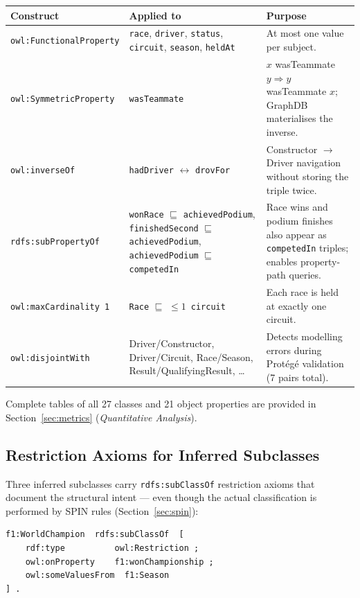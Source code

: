 \documentclass[12pt,a4paper]{article}
\begin{document}
\begin{center}
\begin{tabularx}{\linewidth}{@{}lp{4.5cm}X@{}}
\toprule
\textbf{Construct} & \textbf{Applied to} & \textbf{Purpose} \\
\midrule
\texttt{owl:FunctionalProperty}
  & \texttt{race}, \texttt{driver}, \texttt{status}, \texttt{circuit}, \texttt{season}, \texttt{heldAt}
  & At most one value per subject. \\
\texttt{owl:SymmetricProperty}
  & \texttt{wasTeammate}
  & $x$ wasTeammate $y \Rightarrow y$ wasTeammate $x$; GraphDB materialises the inverse. \\
\texttt{owl:inverseOf}
  & \texttt{hadDriver} $\leftrightarrow$ \texttt{drovFor}
  & Constructor $\to$ Driver navigation without storing the triple twice. \\
\texttt{rdfs:subPropertyOf}
  & \texttt{wonRace} $\sqsubseteq$ \texttt{achievedPodium}, \texttt{finishedSecond} $\sqsubseteq$ \texttt{achievedPodium}, \texttt{achievedPodium} $\sqsubseteq$ \texttt{competedIn}
  & Race wins and podium finishes also appear as \texttt{competedIn} triples; enables property-path queries. \\
\texttt{owl:maxCardinality 1}
  & \texttt{Race} $\sqsubseteq$ $\leq 1$~\texttt{circuit}
  & Each race is held at exactly one circuit. \\
\texttt{owl:disjointWith}
  & Driver/Constructor, Driver/Circuit, Race/Season, Result/QualifyingResult, \ldots
  & Detects modelling errors during Protégé validation (7 pairs total). \\
\bottomrule
\end{tabularx}
\end{center}

\noindent Complete tables of all 27 classes and 21 object properties are provided
in Section~\ref{sec:metrics} (\textit{Quantitative Analysis}).

\subsection{Restriction Axioms for Inferred Subclasses}

Three inferred subclasses carry \texttt{rdfs:subClassOf} restriction axioms
that document the structural intent --- even though the actual classification
is performed by SPIN rules (Section~\ref{sec:spin}):

\begin{lstlisting}[style=turtle, caption={Restriction on WorldChampion: must have at least one wonChampionship}]
f1:WorldChampion  rdfs:subClassOf  [
    rdf:type          owl:Restriction ;
    owl:onProperty    f1:wonChampionship ;
    owl:someValuesFrom  f1:Season
] .
\end{lstlisting}
\end{document}
